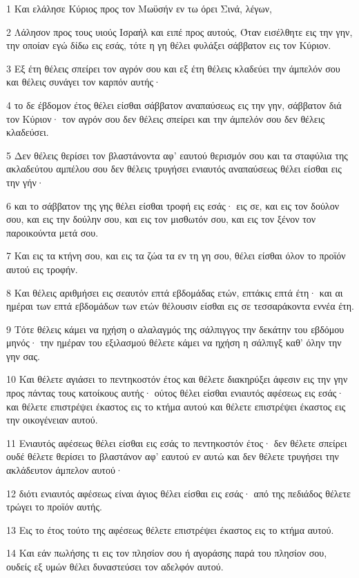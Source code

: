 \par 1 Και ελάλησε Κύριος προς τον Μωϋσήν εν τω όρει Σινά, λέγων,
\par 2 Λάλησον προς τους υιούς Ισραήλ και ειπέ προς αυτούς, Όταν εισέλθητε εις την γην, την οποίαν εγώ δίδω εις εσάς, τότε η γη θέλει φυλάξει σάββατον εις τον Κύριον.
\par 3 Εξ έτη θέλεις σπείρει τον αγρόν σου και εξ έτη θέλεις κλαδεύει την άμπελόν σου και θέλεις συνάγει τον καρπόν αυτής·
\par 4 το δε έβδομον έτος θέλει είσθαι σάββατον αναπαύσεως εις την γην, σάββατον διά τον Κύριον· τον αγρόν σου δεν θέλεις σπείρει και την άμπελόν σου δεν θέλεις κλαδεύσει.
\par 5 Δεν θέλεις θερίσει τον βλαστάνοντα αφ' εαυτού θερισμόν σου και τα σταφύλια της ακλαδεύτου αμπέλου σου δεν θέλεις τρυγήσει ενιαυτός αναπαύσεως θέλει είσθαι εις την γήν·
\par 6 και το σάββατον της γης θέλει είσθαι τροφή εις εσάς· εις σε, και εις τον δούλον σου, και εις την δούλην σου, και εις τον μισθωτόν σου, και εις τον ξένον τον παροικούντα μετά σου.
\par 7 Και εις τα κτήνη σου, και εις τα ζώα τα εν τη γη σου, θέλει είσθαι όλον το προϊόν αυτού εις τροφήν.
\par 8 Και θέλεις αριθμήσει εις σεαυτόν επτά εβδομάδας ετών, επτάκις επτά έτη· και αι ημέραι των επτά εβδομάδων των ετών θέλουσιν είσθαι εις σε τεσσαράκοντα εννέα έτη.
\par 9 Τότε θέλεις κάμει να ηχήση ο αλαλαγμός της σάλπιγγος την δεκάτην του εβδόμου μηνός· την ημέραν του εξιλασμού θέλετε κάμει να ηχήση η σάλπιγξ καθ' όλην την γην σας.
\par 10 Και θέλετε αγιάσει το πεντηκοστόν έτος και θέλετε διακηρύξει άφεσιν εις την γην προς πάντας τους κατοίκους αυτής· ούτος θέλει είσθαι ενιαυτός αφέσεως εις εσάς· και θέλετε επιστρέψει έκαστος εις το κτήμα αυτού και θέλετε επιστρέψει έκαστος εις την οικογένειαν αυτού.
\par 11 Ενιαυτός αφέσεως θέλει είσθαι εις εσάς το πεντηκοστόν έτος· δεν θέλετε σπείρει ουδέ θέλετε θερίσει το βλαστάνον αφ' εαυτού εν αυτώ και δεν θέλετε τρυγήσει την ακλάδευτον άμπελον αυτού·
\par 12 διότι ενιαυτός αφέσεως είναι άγιος θέλει είσθαι εις εσάς· από της πεδιάδος θέλετε τρώγει το προϊόν αυτής.
\par 13 Εις το έτος τούτο της αφέσεως θέλετε επιστρέψει έκαστος εις το κτήμα αυτού.
\par 14 Και εάν πωλήσης τι εις τον πλησίον σου ή αγοράσης παρά του πλησίον σου, ουδείς εξ υμών θέλει δυναστεύσει τον αδελφόν αυτού.
